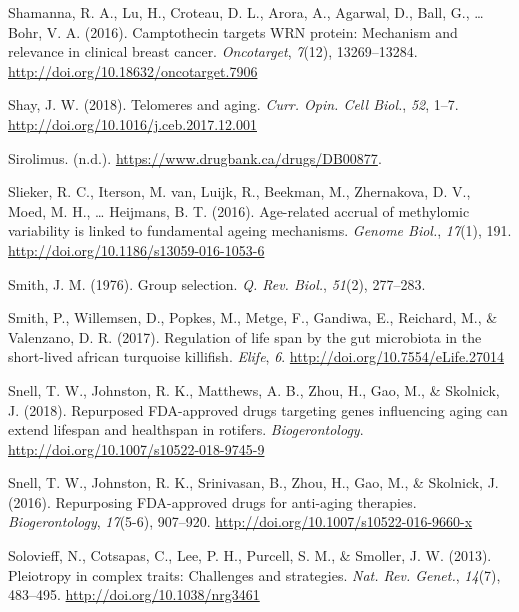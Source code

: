 \documentclass[12pt,twoside]{unicam}
\begin{document}
\begin{cslreferences}
\leavevmode\hypertarget{ref-Shamanna2016}{}%
Shamanna, R. A., Lu, H., Croteau, D. L., Arora, A., Agarwal, D., Ball, G., \ldots{} Bohr, V. A. (2016). Camptothecin targets WRN protein: Mechanism and relevance in clinical breast cancer. \emph{Oncotarget}, \emph{7}(12), 13269--13284. \url{http://doi.org/10.18632/oncotarget.7906}

\leavevmode\hypertarget{ref-Shay2018}{}%
Shay, J. W. (2018). Telomeres and aging. \emph{Curr. Opin. Cell Biol.}, \emph{52}, 1--7. \url{http://doi.org/10.1016/j.ceb.2017.12.001}

\leavevmode\hypertarget{ref-Sirolimus}{}%
Sirolimus. (n.d.). \url{https://www.drugbank.ca/drugs/DB00877}.

\leavevmode\hypertarget{ref-Slieker2016}{}%
Slieker, R. C., Iterson, M. van, Luijk, R., Beekman, M., Zhernakova, D. V., Moed, M. H., \ldots{} Heijmans, B. T. (2016). Age-related accrual of methylomic variability is linked to fundamental ageing mechanisms. \emph{Genome Biol.}, \emph{17}(1), 191. \url{http://doi.org/10.1186/s13059-016-1053-6}

\leavevmode\hypertarget{ref-Smith1976}{}%
Smith, J. M. (1976). Group selection. \emph{Q. Rev. Biol.}, \emph{51}(2), 277--283.

\leavevmode\hypertarget{ref-Smith2017}{}%
Smith, P., Willemsen, D., Popkes, M., Metge, F., Gandiwa, E., Reichard, M., \& Valenzano, D. R. (2017). Regulation of life span by the gut microbiota in the short-lived african turquoise killifish. \emph{Elife}, \emph{6}. \url{http://doi.org/10.7554/eLife.27014}

\leavevmode\hypertarget{ref-Snell2018}{}%
Snell, T. W., Johnston, R. K., Matthews, A. B., Zhou, H., Gao, M., \& Skolnick, J. (2018). Repurposed FDA-approved drugs targeting genes influencing aging can extend lifespan and healthspan in rotifers. \emph{Biogerontology}. \url{http://doi.org/10.1007/s10522-018-9745-9}

\leavevmode\hypertarget{ref-Snell2016}{}%
Snell, T. W., Johnston, R. K., Srinivasan, B., Zhou, H., Gao, M., \& Skolnick, J. (2016). Repurposing FDA-approved drugs for anti-aging therapies. \emph{Biogerontology}, \emph{17}(5-6), 907--920. \url{http://doi.org/10.1007/s10522-016-9660-x}

\leavevmode\hypertarget{ref-Solovieff2013}{}%
Solovieff, N., Cotsapas, C., Lee, P. H., Purcell, S. M., \& Smoller, J. W. (2013). Pleiotropy in complex traits: Challenges and strategies. \emph{Nat. Rev. Genet.}, \emph{14}(7), 483--495. \url{http://doi.org/10.1038/nrg3461}


\end{cslreferences}
\end{document}
